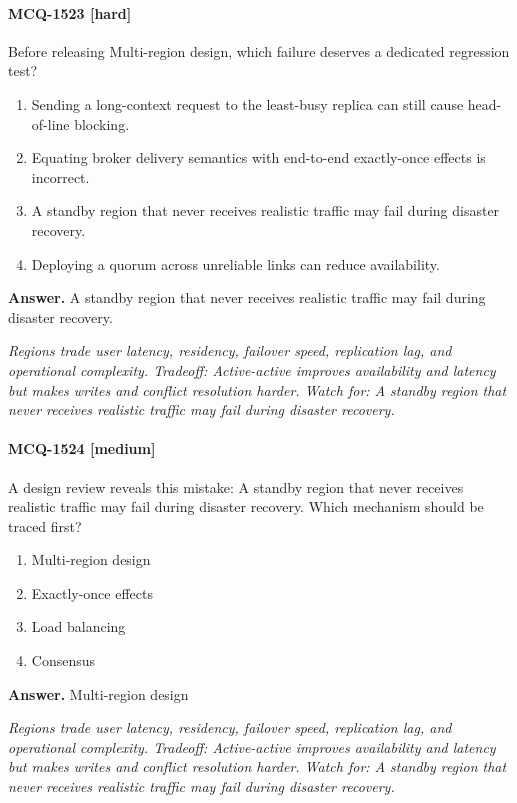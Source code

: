 \paragraph{MCQ-1523 [hard]} Before releasing Multi-region design, which failure deserves a dedicated regression test?
\begin{enumerate}[label=\Alph*.]
\item Sending a long-context request to the least-busy replica can still cause head-of-line blocking.
\item Equating broker delivery semantics with end-to-end exactly-once effects is incorrect.
\item A standby region that never receives realistic traffic may fail during disaster recovery.
\item Deploying a quorum across unreliable links can reduce availability.
\end{enumerate}
\noindent\textbf{Answer.} A standby region that never receives realistic traffic may fail during disaster recovery.
\par\textit{Regions trade user latency, residency, failover speed, replication lag, and operational complexity. Tradeoff: Active-active improves availability and latency but makes writes and conflict resolution harder. Watch for: A standby region that never receives realistic traffic may fail during disaster recovery.}
\paragraph{MCQ-1524 [medium]} A design review reveals this mistake: A standby region that never receives realistic traffic may fail during disaster recovery. Which mechanism should be traced first?
\begin{enumerate}[label=\Alph*.]
\item Multi-region design
\item Exactly-once effects
\item Load balancing
\item Consensus
\end{enumerate}
\noindent\textbf{Answer.} Multi-region design
\par\textit{Regions trade user latency, residency, failover speed, replication lag, and operational complexity. Tradeoff: Active-active improves availability and latency but makes writes and conflict resolution harder. Watch for: A standby region that never receives realistic traffic may fail during disaster recovery.}
